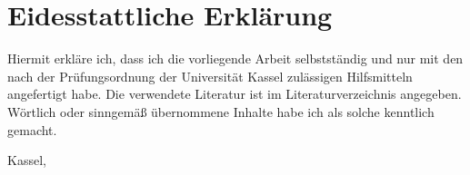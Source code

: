\setcounter{page}{0}
\chapter*{Eidesstattliche Erklärung}

Hiermit erkläre ich, dass ich die vorliegende Arbeit selbstständig und nur mit den nach der Prüfungsordnung der Universität Kassel zulässigen Hilfsmitteln angefertigt habe.
Die verwendete Literatur ist im Literaturverzeichnis angegeben.
Wörtlich oder sinngemäß übernommene Inhalte habe ich als solche kenntlich gemacht.

\vspace{1cm}

Kassel, \thesisdate

\begin{flushright}
  \underline{\hspace{7cm}} \\
  \thesisauthorname

\end{flushright}
